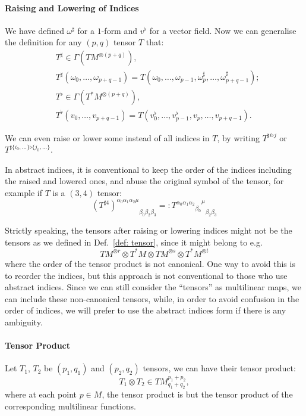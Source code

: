 \documentclass[openany, oneside, a5paper]{book}
\begin{document}
\paragraph{Raising and Lowering of Indices}
We have defined $\omega^\sharp$ for a $1$-form and $v^{\flat}$ for a vector field.
Now we can generalise the definition for any $(p, q)$ tensor $T$ that:
\begin{align}
    &T^\sharp \in \Gamma(TM^{\otimes (p + q)}), 
    \\
    &T^\sharp(\omega_0, \ldots, \omega_{p+q-1}) 
    = T(\omega_0, \ldots, \omega_{p-1}, \omega_p^\sharp, \ldots, \omega_{p+q-1}^\sharp); 
    \\
    &T^{\flat} \in \Gamma(T^*M^{\otimes (p + q)}),
    \\
    &T^{\flat}(v_0, \ldots, v_{p+q-1})
    = T(v_0^{\flat}, \ldots, v_{p-1}^{\flat}, v_p, \ldots, v_{p+q-1}).
\end{align}

We can even raise or lower some instead of all indices in $T$, by writing $T^{\sharp i\flat j}$ or $T^{\sharp\{i_0, \ldots\}\flat\{j_0, \ldots\}}$.

In abstract indices, it is conventional to keep the order of the indices including the raised and lowered ones, and abuse the original symbol of the tensor, for example if $T$ is a $(3, 4)$ tensor:
\begin{equation}
    {(T^{\sharp4})^{\alpha_0 \alpha_1 \alpha_2 \mu}}_{\beta_0 \beta_2\beta_3}
    =: {{{T^{\alpha_0 \alpha_1 \alpha_2}}_{\beta_0}}^{\mu}}_{\beta_2\beta_3} 
\end{equation}

Strictly speaking, the tensors after raising or lowering indices might not be the tensors as we defined in Def.~\ref{def: tensor}, since it might belong to e.g.\ 
\begin{equation}
    TM^{\otimes r} \otimes T^*M \otimes TM^{\otimes s} \otimes T^*M^{\otimes t}
\end{equation}
where the order of the tensor product is not canonical.
One way to avoid this is to reorder the indices, but this approach is not conventional to those who use abstract indices.
Since we can still consider the ``tensors'' as multilinear maps, we can include these non-canonical tensors, while, in order to avoid confusion in the order of indices, we will prefer to use the abstract indices form if there is any ambiguity.


\paragraph{Tensor Product}
Let $T_1$, $T_2$ be $(p_1, q_1)$ and $(p_2, q_2)$ tensors, we can have their tensor product:
\begin{equation}
    T_1 \otimes T_2 \in TM^{p_1 + p_2}_{q_1 + q_2},
\end{equation}
where at each point $p \in M$, the tensor product is but the tensor product of the corresponding multilinear functions.
\end{document}

